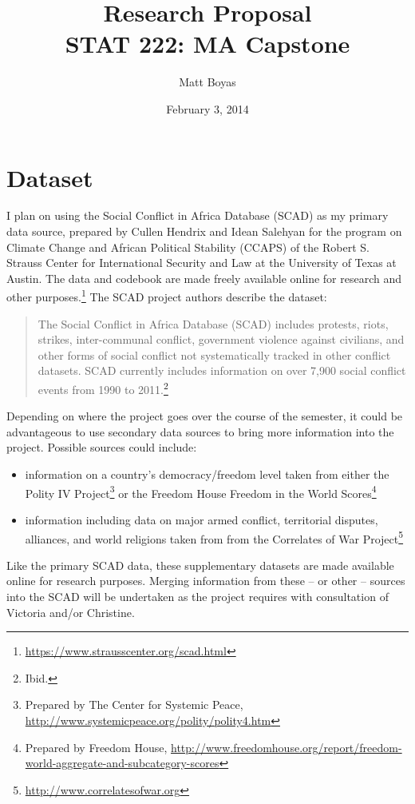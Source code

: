 \documentclass{article}
\begin{document}
\title{Research Proposal\\STAT 222: MA Capstone}
\author{Matt Boyas}

\date{February 3, 2014}
\maketitle
\section{Dataset}
I plan on using the Social Conflict in Africa Database (SCAD) as my primary data source, prepared by Cullen Hendrix and Idean Salehyan for the program on Climate Change and African Political Stability (CCAPS) of the Robert S. Strauss Center for International Security and Law at the University of Texas at Austin.  The data and codebook are made freely available online for research and other purposes.\footnote{\url{https://www.strausscenter.org/scad.html}}  The SCAD project authors describe the dataset:

\blockquote{The Social Conflict in Africa Database (SCAD) includes protests, riots, strikes, inter-communal conflict, government violence against civilians, and other forms of social conflict not systematically tracked in other conflict datasets. SCAD currently includes information on over 7,900 social conflict events from 1990 to 2011.\footnote{Ibid.}}

Depending on where the project goes over the course of the semester, it could be advantageous to use secondary data sources to bring more information into the project.  Possible sources could include:
\begin{itemize}
\item information on a country's democracy/freedom level taken from either the Polity IV Project\footnote{Prepared by The Center for Systemic Peace, \url{http://www.systemicpeace.org/polity/polity4.htm}} or the Freedom House Freedom in the World Scores\footnote{Prepared by Freedom House, \url{http://www.freedomhouse.org/report/freedom-world-aggregate-and-subcategory-scores}}
\item information including data on major armed conflict, territorial disputes, alliances, and world religions taken from from the Correlates of War Project\footnote{\url{http://www.correlatesofwar.org}}
\end{itemize}
Like the primary SCAD data, these supplementary datasets are made available online for research purposes.  Merging information from these -- or other -- sources into the SCAD will be undertaken as the project requires with consultation of Victoria and/or Christine.
\end{document}
